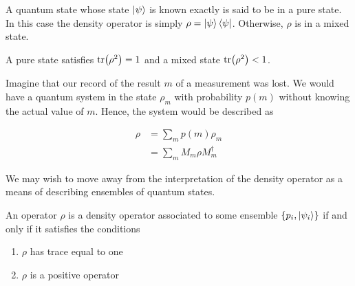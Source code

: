 \documentclass[main.tex]{subfiles}
\begin{document}
A quantum state whose state $\ket{\psi}$ is known exactly is said to be in a pure state. In this case the density operator is simply $\rho = \ket{\psi}\bra{\psi}$. Otherwise, $\rho$ is in a mixed state.

A pure state satisfies $\tr(\rho^2) = 1$ and a mixed state $\tr(\rho^2) < 1$.

Imagine that our record of the result $m$ of a measurement was lost. We would have a quantum system in the state $\rho_m$ with probability $p(m)$ without knowing the actual value of $m$. Hence, the system would be described as

\begin{align*}
\rho &= \sum_m p(m) \rho_m	\\
&= \sum_m M_m \rho M_m^\dag
\end{align*}

We may wish to move away from the interpretation of the density operator as a means of describing ensembles of quantum states.

\begin{theorem}
An operator $\rho$ is a density operator associated to some ensemble $\{p_i, \ket{\psi_i}\}$ if and only if it satisfies the conditions

\begin{enumerate}
\item $\rho$ has trace equal to one
\item $\rho$ is a positive operator
\end{enumerate}

%
%
%
%
\end{theorem}
\end{document}
